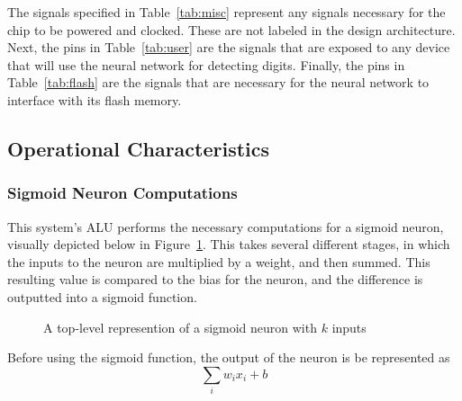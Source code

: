 \documentclass[12pt]{article}
\begin{document}
The signals specified in Table~\ref{tab:misc} represent any signals necessary for the chip to be powered and clocked. These are not labeled in the design architecture. Next, the pins in Table~\ref{tab:user} are the signals that are exposed to any device that will use the neural network for detecting digits. Finally, the pins in Table~\ref{tab:flash} are the signals that are necessary for the neural network to interface with its flash memory.

\subsection{Operational Characteristics}

\subsubsection{Sigmoid Neuron Computations}

This system’s ALU performs the necessary computations for a sigmoid neuron, visually depicted below in Figure~\ref{fig:sigfig}. This takes several different stages, in which the inputs to the neuron are multiplied by a weight, and then summed. This resulting value is compared to the bias for the neuron, and the difference is outputted into a sigmoid function.\\


\begin{figure}[H]
    \centering
    \caption{A top-level represention of a sigmoid neuron with $k$ inputs}
    \label{fig:sigfig}
\end{figure}

Before using the sigmoid function, the output of the neuron is be represented as\\

\begin{equation}\label{pre-sigmoid}
\sum_i w_ix_i  + b
\end{equation}
\end{document}
